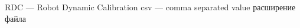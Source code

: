 \newpage
\begin{abbreviations}



RDC --- Robot Dynamic Calibration
csv --- comma separated value расширение файла

\end{abbreviations}